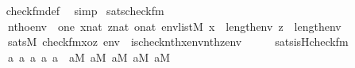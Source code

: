 \begin{isabellebody}
%
\isadelimproof
\ \ %
\endisadelimproof
%
\isatagproof
{}\isamarkupfalse%
\ check{\isacharunderscore}{\kern0pt}fm{\isacharunderscore}{\kern0pt}def\ \isamarkupfalse%
\ simp%
\endisatagproof
{\isafoldproof}%
%
\isadelimproof
\isanewline
%
\endisadelimproof
\isanewline
{}\isamarkupfalse%
\ sats{\isacharunderscore}{\kern0pt}check{\isacharunderscore}{\kern0pt}fm\ {\isacharcolon}{\kern0pt}\isanewline
\ \ \isanewline
\ \ \ \ {\isachardoublequoteopen}nth{\isacharparenleft}{\kern0pt}o{\isacharcomma}{\kern0pt}env{\isacharparenright}{\kern0pt}\ {\isacharequal}{\kern0pt}\ one{\isachardoublequoteclose}\ {\isachardoublequoteopen}x{\isasymin}nat{\isachardoublequoteclose}\ {\isachardoublequoteopen}z{\isasymin}nat{\isachardoublequoteclose}\ {\isachardoublequoteopen}o{\isasymin}nat{\isachardoublequoteclose}\ {\isachardoublequoteopen}env{\isasymin}list{\isacharparenleft}{\kern0pt}M{\isacharparenright}{\kern0pt}{\isachardoublequoteclose}\ {\isachardoublequoteopen}x\ {\isacharless}{\kern0pt}\ length{\isacharparenleft}{\kern0pt}env{\isacharparenright}{\kern0pt}{\isachardoublequoteclose}\ {\isachardoublequoteopen}z\ {\isacharless}{\kern0pt}\ length{\isacharparenleft}{\kern0pt}env{\isacharparenright}{\kern0pt}{\isachardoublequoteclose}\isanewline
\ \ \isanewline
\ \ \ \ {\isachardoublequoteopen}sats{\isacharparenleft}{\kern0pt}M{\isacharcomma}{\kern0pt}\ check{\isacharunderscore}{\kern0pt}fm{\isacharparenleft}{\kern0pt}x{\isacharcomma}{\kern0pt}o{\isacharcomma}{\kern0pt}z{\isacharparenright}{\kern0pt}{\isacharcomma}{\kern0pt}\ env{\isacharparenright}{\kern0pt}\ {\isasymlongleftrightarrow}\ is{\isacharunderscore}{\kern0pt}check{\isacharparenleft}{\kern0pt}nth{\isacharparenleft}{\kern0pt}x{\isacharcomma}{\kern0pt}env{\isacharparenright}{\kern0pt}{\isacharcomma}{\kern0pt}nth{\isacharparenleft}{\kern0pt}z{\isacharcomma}{\kern0pt}env{\isacharparenright}{\kern0pt}{\isacharparenright}{\kern0pt}{\isachardoublequoteclose}\isanewline
%
\isadelimproof
%
\endisadelimproof
%
\isatagproof
{}\isamarkupfalse%
\ {\isacharminus}{\kern0pt}\isanewline
\ \ \isamarkupfalse%
\ sats{\isacharunderscore}{\kern0pt}is{\isacharunderscore}{\kern0pt}Hcheck{\isacharunderscore}{\kern0pt}fm{\isacharcolon}{\kern0pt}\isanewline
\ \ \ \ {\isachardoublequoteopen}{\isasymAnd}a{}\ a{}\ a{}\ a{}\ a{}{\isachardot}{\kern0pt}\ {\isasymlbrakk}\ a{}{\isasymin}M{\isacharsemicolon}{\kern0pt}\ a{}{\isasymin}M{\isacharsemicolon}{\kern0pt}\ a{}{\isasymin}M{\isacharsemicolon}{\kern0pt}\ a{}{\isasymin}M{\isacharsemicolon}{\kern0pt}\ a{}{\isasymin}M\ {\isasymrbrakk}\ {\isasymLongrightarrow}\isanewline

\end{isabellebody}
